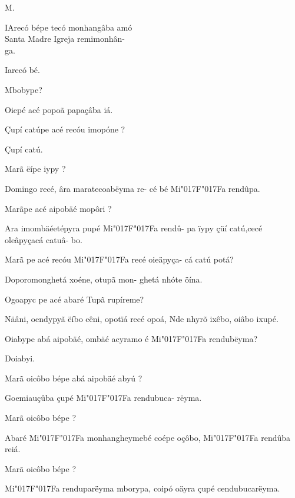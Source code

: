 \documentclass[openany,titlepage,12pt]{book}
\newcommand{\lgSS}{\char"017F\char"017F}
\newcommand{\comecalista}[5]{
    \hspace*{-11.7pt}
    \begin{minipage}[t]{0.08\linewidth}
        \flushright #1\\#2
    \end{minipage}
    \hspace{0pt}
    \begin{minipage}[t]{0.94\linewidth}
        \lettrine
        [findent =2pt, nindent=0pt,  lines=2]
        {#3}{#4}#5
    \end{minipage}
    \vspace*{-3pt}
}
\begin{document}
\comecalista{M.}{}{I}{A}
{recó bépe tecó monhangâba amó\\
    \hspace*{2ex}Santa Madre Igreja remimonhân-\\
    \hspace*{4.5ex}ga.
}
\begin{altereven}
    \item Iarecó bé.
    \item Mbobype?
    \item Oiepé acé popoã papaçâba iá.
    \item Çupí catúpe acé recóu imopóne ?
    \item Çupí catú.
    \item Marã ëípe iypy ?
    \item Domingo recé, âra maratecoabëyma re-
        cé bé Mi\lgSS a rendûpa.
    \item Marãpe acé aipobäé mopôri ?
    \item Ara imombäéetépyra pupé Mi\lgSS a rendû-
        pa ïypy çüí catú,cecé oleâpyçacá catuâ-\linebreak
        bo.
    \item Marã pe acé recóu Mi\lgSS a recé oieäpyça-
        cá catú potá?
    \item Doporomonghetá xoéne, otupã mon-\linebreak
        ghetá nhóte öína.
    \item Ogoapyc pe acé abaré Tupã rupíreme?
    \item Näâni, oendypyã ëíbo cêni, opotïá recé
        opoá, Nde nhyrõ ixêbo, oiâbo ixupé.
    \item Oiabype abá aipobäé, ombäé acyramo é
        Mi\lgSS a rendubëyma?
    \item Doiabyi.
    \item Marã oicôbo bépe abá aipobäé abyú ?
    \item  Goemiauçûba çupé Mi\lgSS a rendubuca-\linebreak
        rëyma.
    \item Marã oicôbo bépe ?
    \item Abaré Mi\lgSS a monhangheymebé coépe\linebreak
        oçôbo, Mi\lgSS a rendûba reiá.
    \item Marã oicôbo bépe ?
    \item Mi\lgSS a renduparëyma mborypa, coipó\linebreak
         oäyra çupé cendubucarëyma.
\end{altereven}
\end{document}
